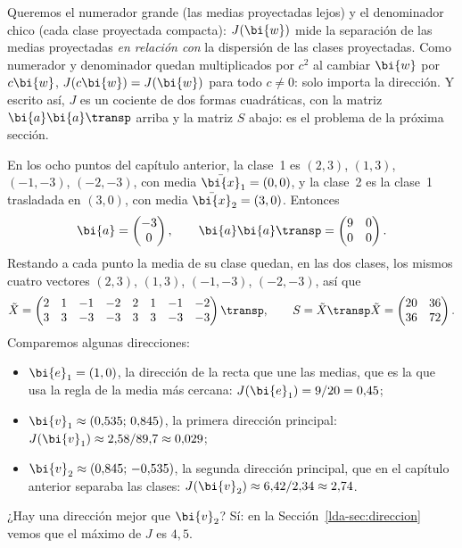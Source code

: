 Queremos el numerador grande (las medias proyectadas lejos) y el denominador
chico (cada clase proyectada compacta): $J(\bi{w})$ mide la separación de las
medias proyectadas \emph{en relación con} la dispersión de las clases
proyectadas. Como numerador y denominador quedan multiplicados por $c^2$ al
cambiar $\bi{w}$ por $c\bi{w}$, $J(c\bi{w})=J(\bi{w})$ para todo $c\ne0$: solo importa la
dirección. Y escrito así, $J$ es un cociente de dos formas cuadráticas, con la
matriz $\bi{a}\bi{a}\transp$ arriba y la matriz $S$ abajo: es el problema de la
próxima sección.

\begin{example}\label{lda-ejem:ocho}
En los ocho puntos del capítulo anterior, la clase~1 es $(2,3)$, $(1,3)$,
$(-1,-3)$, $(-2,-3)$, con media $\bar{\bi{x}}_1=(0,0)$, y la clase~2 es la clase~1
trasladada en $(3,0)$, con media $\bar{\bi{x}}_2=(3,0)$. Entonces
\[
\bi{a}=\begin{pmatrix}-3\\0\end{pmatrix},\qquad \bi{a}\bi{a}\transp=\begin{pmatrix}9&0\\0&0\end{pmatrix}.
\]
Restando a cada punto la media de su clase quedan, en las dos clases, los
mismos cuatro vectores $(2,3)$, $(1,3)$, $(-1,-3)$, $(-2,-3)$, así que
\[
\tilde X=\begin{pmatrix}2&1&-1&-2&2&1&-1&-2\\3&3&-3&-3&3&3&-3&-3\end{pmatrix}\transp,\qquad
S=\tilde X\transp \tilde X=\begin{pmatrix}20&36\\36&72\end{pmatrix}.
\]
Comparemos algunas direcciones:
\begin{itemize}[leftmargin=*,itemsep=1pt]
\item $\bi{e}_1=(1,0)$, la dirección de la recta que une las medias, que es la que
usa la regla de la media más cercana: $J(\bi{e}_1)=9/20=0{,}45$;
\item $\bi{v}_1\approx(0{,}535;\,0{,}845)$, la primera dirección principal:
$J(\bi{v}_1)\approx2{,}58/89{,}7\approx0{,}029$;
\item $\bi{v}_2\approx(0{,}845;\,-0{,}535)$, la segunda dirección principal, que en
el capítulo anterior separaba las clases: $J(\bi{v}_2)\approx6{,}42/2{,}34\approx2{,}74$.
\end{itemize}
¿Hay una dirección mejor que $\bi{v}_2$? Sí: en la Sección~\ref{lda-sec:direccion}
vemos que el máximo de $J$ es $4{,}5$.
\end{example}

